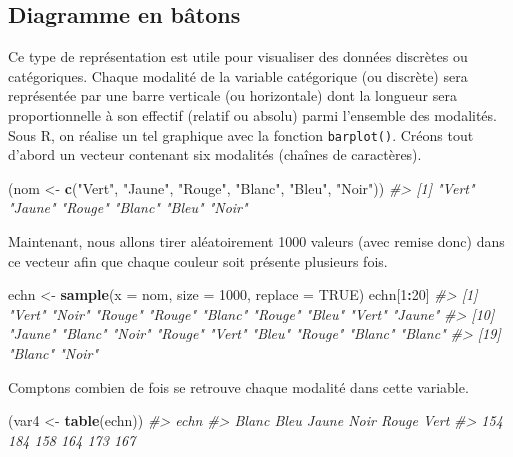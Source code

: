 \documentclass[]{article}
\newenvironment{Shaded}{\begin{snugshade}}{\end{snugshade}}
\newcommand{\CommentTok}[1]{\textcolor[rgb]{0.56,0.35,0.01}{\textit{#1}}}
\newcommand{\DataTypeTok}[1]{\textcolor[rgb]{0.13,0.29,0.53}{#1}}
\newcommand{\DecValTok}[1]{\textcolor[rgb]{0.00,0.00,0.81}{#1}}
\newcommand{\KeywordTok}[1]{\textcolor[rgb]{0.13,0.29,0.53}{\textbf{#1}}}
\newcommand{\NormalTok}[1]{#1}
\newcommand{\OperatorTok}[1]{\textcolor[rgb]{0.81,0.36,0.00}{\textbf{#1}}}
\newcommand{\OtherTok}[1]{\textcolor[rgb]{0.56,0.35,0.01}{#1}}
\newcommand{\StringTok}[1]{\textcolor[rgb]{0.31,0.60,0.02}{#1}}
\begin{document}
\hypertarget{diagramme-en-buxe2tons}{%
\subsection{Diagramme en bâtons}\label{diagramme-en-buxe2tons}}

Ce type de représentation est utile pour visualiser des données discrètes ou catégoriques. Chaque modalité de la variable catégorique (ou discrète) sera représentée par une barre verticale (ou horizontale) dont la longueur sera proportionnelle à son effectif (relatif ou absolu) parmi l'ensemble des modalités. Sous R, on réalise un tel graphique avec la fonction \texttt{barplot()}.
Créons tout d'abord un vecteur contenant six modalités (chaînes de caractères).

\begin{Shaded}
\begin{Highlighting}[]
\NormalTok{(nom <-}\StringTok{ }\KeywordTok{c}\NormalTok{(}\StringTok{"Vert"}\NormalTok{, }\StringTok{"Jaune"}\NormalTok{, }\StringTok{"Rouge"}\NormalTok{, }\StringTok{"Blanc"}\NormalTok{, }\StringTok{"Bleu"}\NormalTok{, }\StringTok{"Noir"}\NormalTok{))}
\CommentTok{#> [1] "Vert"  "Jaune" "Rouge" "Blanc" "Bleu"  "Noir"}
\end{Highlighting}
\end{Shaded}

Maintenant, nous allons tirer aléatoirement 1000 valeurs (avec remise donc) dans ce vecteur afin que chaque couleur soit présente plusieurs fois.

\begin{Shaded}
\begin{Highlighting}[]
\NormalTok{echn <-}\StringTok{ }\KeywordTok{sample}\NormalTok{(}\DataTypeTok{x =}\NormalTok{ nom, }\DataTypeTok{size =} \DecValTok{1000}\NormalTok{, }\DataTypeTok{replace =} \OtherTok{TRUE}\NormalTok{)}
\NormalTok{echn[}\DecValTok{1}\OperatorTok{:}\DecValTok{20}\NormalTok{]}
\CommentTok{#>  [1] "Vert"  "Noir"  "Rouge" "Rouge" "Blanc" "Rouge" "Bleu"  "Vert"  "Jaune"}
\CommentTok{#> [10] "Jaune" "Blanc" "Noir"  "Rouge" "Vert"  "Bleu"  "Rouge" "Blanc" "Blanc"}
\CommentTok{#> [19] "Blanc" "Noir"}
\end{Highlighting}
\end{Shaded}

Comptons combien de fois se retrouve chaque modalité dans cette variable.

\begin{Shaded}
\begin{Highlighting}[]
\NormalTok{(var4 <-}\StringTok{ }\KeywordTok{table}\NormalTok{(echn))}
\CommentTok{#> echn}
\CommentTok{#> Blanc  Bleu Jaune  Noir Rouge  Vert }
\CommentTok{#>   154   184   158   164   173   167}
\end{Highlighting}
\end{Shaded}
\end{document}
